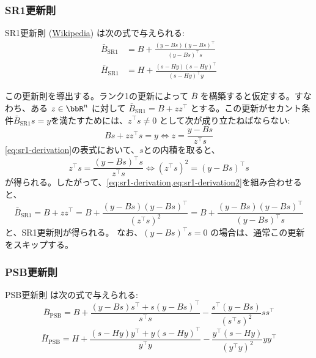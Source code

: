 \documentclass[a4paper, 10pt, dvipdfmx,draft]{article}
\begin{document}
\subsubsection{SR1更新則}

SR1更新則 \cite{nocedal1999numerical}(\href{https://en.wikipedia.org/wiki/Symmetric_rank-one}{Wikipedia}) は次の式で与えられる:
\begin{align*}
    \bar{B}_{\mathrm{SR1}} & = B + \frac{(y - B s)(y - B s)^\top}{(y - B s)^\top s} \\
    \bar{H}_{\mathrm{SR1}} & = H + \frac{(s - H y)(s - H y)^\top}{(s - H y)^\top y}
\end{align*}

この更新則を導出する。ランク1の更新によって $\bar{B}$ を構築すると仮定する。すなわち、ある $z \in \bbR^n$ に対して $\bar{B}_{\mathrm{SR1}} = B + z z^\top$ とする。この更新がセカント条件$\bar{B}_{\mathrm{SR1}} s = y$を満たすためには、$z^\top s \neq 0$ として次が成り立たねばならない:
\begin{equation}\label{eq:sr1-derivation}
    B s + z z^\top s = y \iff z = \frac{y - B s}{z^\top s}
\end{equation}
\cref{eq:sr1-derivation}の表式において、$s$との内積を取ると、
\begin{equation}\label{eq:sr1-derivation2}
    z^\top s = \frac{(y - B s)^\top s}{z^\top s} \iff (z^\top s)^2 = (y - B s)^\top s
\end{equation}
が得られる。したがって、\cref{eq:sr1-derivation,eq:sr1-derivation2}を組み合わせると、
\begin{equation*}
    \bar{B}_{\mathrm{SR1}}
    = B + z z^\top
    = B + \frac{(y - B s)(y - B s)^\top}{(z^\top s)^2}
    = B + \frac{(y - B s)(y - B s)^\top}{(y - B s)^\top s}
\end{equation*}
と、SR1更新則が得られる。
なお、$(y - Bs)^\top s = 0$ の場合は、通常この更新をスキップする。

\subsubsection{PSB更新則}

PSB更新則 \cite{haeltermanAnalyticalStudyLeast2009} は次の式で与えられる:
\begin{equation*}
    \bar{B}_{\mathrm{PSB}} = B + \frac{(y - B s) s^\top + s (y - B s)^\top}{s^\top s} - \frac{s^\top (y - B s)}{(s^\top s)^2} s s^\top
\end{equation*}
\begin{equation*}
    \bar{H}_{\mathrm{PSB}} = H + \frac{(s - H y) y^\top + y (s - H y)^\top}{y^\top y} - \frac{y^\top (s - H y)}{(y^\top y)^2} y y^\top
\end{equation*}
\end{document}
